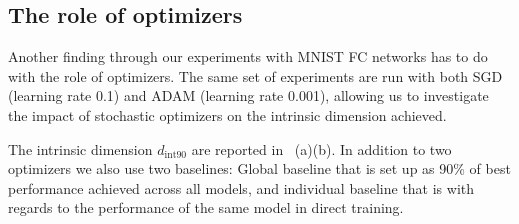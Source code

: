 \documentclass{article} %
\newcommand{\dintn}{d_{\mathrm{int90}}}
\begin{document}





\subsection{The role of optimizers}

Another finding through our experiments with MNIST FC networks has to do with the role of optimizers. The same set of experiments are run with both SGD (learning rate 0.1) and ADAM (learning rate 0.001), allowing us to investigate the impact of stochastic optimizers on the intrinsic dimension achieved. 

The intrinsic dimension $\dintn$ are reported in~ (a)(b). In addition to two optimizers we also use two baselines: Global baseline that is set up as 90\% of best performance achieved across all models, and individual baseline that is with regards to the performance of the same model in direct training.
\end{document}
